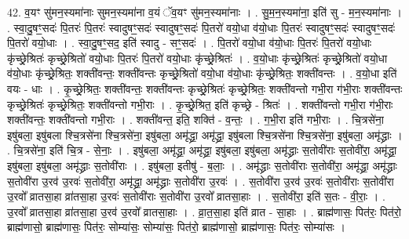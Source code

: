 \documentclass[17pt]{extarticle}
\begin{document}
42. व॒यꣳ सु॑मन॒स्यमा॑नाः सुमन॒स्यमा॑ना व॒यं ॅव॒यꣳ सु॑मन॒स्यमा॑नाः । . सु॒म॒न॒स्यमा॑ना॒ इति॑ सु - म॒न॒स्यमा॑नाः । . स्वा॒दु॒षꣳ॒॒सदः॑ पि॒तरः॑ पि॒तरः॑ स्वादुषꣳ॒॒सदः॑ स्वादुषꣳ॒॒सदः॑ पि॒तरो॑ वयो॒धा व॑यो॒धाः पि॒तरः॑ स्वादुषꣳ॒॒सदः॑ स्वादुषꣳ॒॒सदः॑ पि॒तरो॑ वयो॒धाः । . स्वा॒दु॒षꣳ॒॒सद॒ इति॑ स्वादु - सꣳ॒॒सदः॑ । . पि॒तरो॑ वयो॒धा व॑यो॒धाः पि॒तरः॑ पि॒तरो॑ वयो॒धाः कृ॑च्छ्रे॒श्रितः॑ कृच्छ्रे॒श्रितो॑ वयो॒धाः पि॒तरः॑ पि॒तरो॑ वयो॒धाः कृ॑च्छ्रे॒श्रितः॑ । . व॒यो॒धाः कृ॑च्छ्रे॒श्रितः॑ कृच्छ्रे॒श्रितो॑ वयो॒धा व॑यो॒धाः कृ॑च्छ्रे॒श्रितः॒ शक्ती॑वन्तः॒ शक्ती॑वन्तः कृच्छ्रे॒श्रितो॑ वयो॒धा व॑यो॒धाः कृ॑च्छ्रे॒श्रितः॒ शक्ती॑वन्तः । . व॒यो॒धा इति॑ वयः - धाः । . कृ॒च्छ्रे॒श्रितः॒ शक्ती॑वन्तः॒ शक्ती॑वन्तः कृच्छ्रे॒श्रितः॑ कृच्छ्रे॒श्रितः॒ शक्ती॑वन्तो गभी॒रा ग॑भी॒राः शक्ती॑वन्तः कृच्छ्रे॒श्रितः॑ कृच्छ्रे॒श्रितः॒ शक्ती॑वन्तो गभी॒राः । . कृ॒च्छ्रे॒श्रित॒ इति॑ कृच्छ्रे - श्रितः॑ । . शक्ती॑वन्तो गभी॒रा ग॑भी॒राः शक्ती॑वन्तः॒ शक्ती॑वन्तो गभी॒राः । . शक्ती॑वन्त॒ इति॒ शक्ति॑ - व॒न्तः॒ । . ग॒भी॒रा इति॑ गभी॒राः । . चि॒त्रसे॑ना॒ इषु॑बला॒ इषु॑बला श्चि॒त्रसे॑ना श्चि॒त्रसे॑ना॒ इषु॑बला॒ अमृ॑द्ध्रा॒ अमृ॑द्ध्रा॒ इषु॑बला श्चि॒त्रसे॑ना श्चि॒त्रसे॑ना॒ इषु॑बला॒ अमृ॑द्ध्राः । . चि॒त्रसे॑ना॒ इति॑ चि॒त्र - से॒नाः॒ । . इषु॑बला॒ अमृ॑द्ध्रा॒ अमृ॑द्ध्रा॒ इषु॑बला॒ इषु॑बला॒ अमृ॑द्ध्राः स॒तोवी॑राः स॒तोवी॑रा॒ अमृ॑द्ध्रा॒ इषु॑बला॒ इषु॑बला॒ अमृ॑द्ध्राः स॒तोवी॑राः । . इषु॑बला॒ इतीषु॑ - ब॒लाः॒ । . अमृ॑द्ध्राः स॒तोवी॑राः स॒तोवी॑रा॒ अमृ॑द्ध्रा॒ अमृ॑द्ध्राः स॒तोवी॑रा उ॒रव॑ उ॒रवः॑ स॒तोवी॑रा॒ अमृ॑द्ध्रा॒ अमृ॑द्ध्राः स॒तोवी॑रा उ॒रवः॑ । . स॒तोवी॑रा उ॒रव॑ उ॒रवः॑ स॒तोवी॑राः स॒तोवी॑रा उ॒रवो᳚ व्रातसा॒हा व्रा॑तसा॒हा उ॒रवः॑ स॒तोवी॑राः स॒तोवी॑रा उ॒रवो᳚ व्रातसा॒हाः । . स॒तोवी॑रा॒ इति॑ स॒तः - वी॒राः॒ । . उ॒रवो᳚ व्रातसा॒हा व्रा॑तसा॒हा उ॒रव॑ उ॒रवो᳚ व्रातसा॒हाः । . व्रा॒त॒सा॒हा इति॑ व्रात - सा॒हाः । . ब्राह्म॑णासः॒ पित॑रः॒ पित॑रो॒ ब्राह्म॑णासो॒ ब्राह्म॑णासः॒ पित॑रः॒ सोम्या॑सः॒ सोम्या॑सः॒ पित॑रो॒ ब्राह्म॑णासो॒ ब्राह्म॑णासः॒ पित॑रः॒ सोम्या॑सः । \newline
\pagebreak
{}
\end{document}
